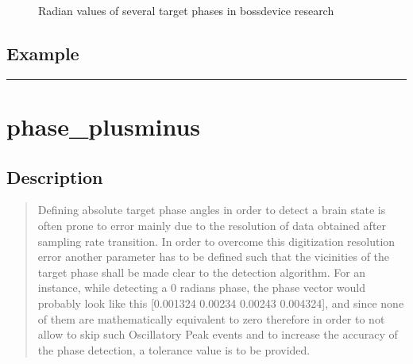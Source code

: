 \documentclass[letterpaper,10pt,english]{sphinxmanual}
\begin{document}
\begin{figure}[htbp]
\centering
\capstart

\noindent{}
\caption{Radian values of several target phases in bossdevice research}\label{\detokenize{4_api_documentation:id53}}\end{figure}


\subsection{Example}
\label{\detokenize{4_api_documentation:id24}}
\begin{sphinxVerbatim}[commandchars=\\\{\}]
\end{sphinxVerbatim}


\bigskip\hrule\bigskip



\section{phase\_plusminus}
\label{\detokenize{4_api_documentation:phase-plusminus}}

\subsection{Description}
\label{\detokenize{4_api_documentation:id25}}\begin{quote}

\sphinxAtStartPar
Defining absolute target phase angles in order to detect a brain state is often prone to error mainly due to the resolution of data obtained after sampling rate transition. In order to overcome this digitization resolution error another parameter has to be defined such that the vicinities of the target phase shall be made clear to the detection algorithm. For an instance, while detecting a 0 radians phase, the phase vector would probably look like this {[}\sphinxhyphen{}0.001324 \sphinxhyphen{}0.00234 0.00243 0.004324{]}, and since none of them are mathematically equivalent to zero therefore in order to not allow to skip such Oscillatory Peak events and to increase the accuracy of the phase detection, a tolerance value is to be provided.
\end{quote}
\end{document}
